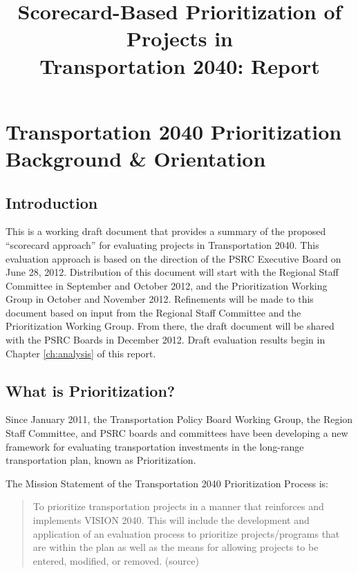 \documentclass[10pt, letterpaper, final, twoside, onecolumn]{memoir}%
\title{Scorecard-Based Prioritization of Projects in \\Transportation 2040: Report}
\author{}
\begin{document}
\mainmatter
\maketitle

\tableofcontents %
\clearpage
\listoffigures %
\listoftables %




\chapter{Transportation 2040 Prioritization Background \& Orientation}

\section{Introduction}
This is a working draft document that provides a summary of the proposed “scorecard approach” for evaluating projects in Transportation 2040. This evaluation approach is based on the direction of the PSRC Executive Board on June 28, 2012. Distribution of this document will start with the Regional Staff Committee in September and October 2012, and the Prioritization Working Group in October and November 2012. Refinements will be made to this document based on input from the Regional Staff Committee and the Prioritization Working Group. From there, the draft document will be shared with the PSRC Boards in December 2012. Draft evaluation results begin in Chapter \ref{ch:analysis} of this report.

\section{What is Prioritization?}
Since January 2011, the Transportation Policy Board Working Group, the Region Staff Committee, and PSRC boards and committees have been developing a new framework for evaluating transportation investments in the long-range transportation plan, known as Prioritization.

The Mission Statement of the Transportation 2040 Prioritization Process is:

\begin{quotation}
To prioritize transportation projects in a manner that reinforces and implements VISION 2040. This will include the development and application of an evaluation process to prioritize projects/programs that are within the plan as well as the means for allowing projects to be entered, modified, or removed. (source)
\end{quotation}
\end{document}
